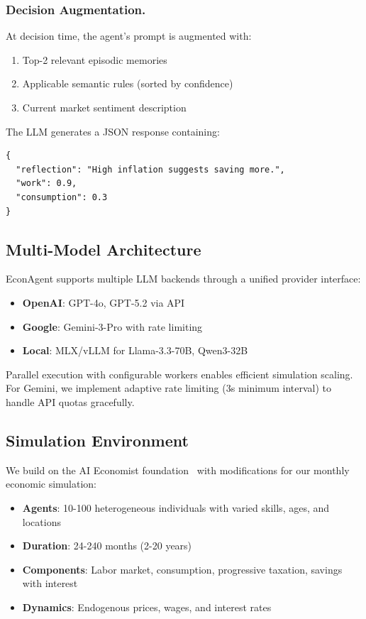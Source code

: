 \documentclass[runningheads]{llncs}
\begin{document}
\subsubsection{Decision Augmentation.}
At decision time, the agent's prompt is augmented with:
\begin{enumerate}
    \item Top-2 relevant episodic memories
    \item Applicable semantic rules (sorted by confidence)
    \item Current market sentiment description
\end{enumerate}

The LLM generates a JSON response containing:
\begin{verbatim}
{
  "reflection": "High inflation suggests saving more.",
  "work": 0.9,
  "consumption": 0.3
}
\end{verbatim}

\subsection{Multi-Model Architecture}

EconAgent supports multiple LLM backends through a unified provider interface:

\begin{itemize}
    \item \textbf{OpenAI}: GPT-4o, GPT-5.2 via API
    \item \textbf{Google}: Gemini-3-Pro with rate limiting
    \item \textbf{Local}: MLX/vLLM for Llama-3.3-70B, Qwen3-32B
\end{itemize}

Parallel execution with configurable workers enables efficient simulation scaling. For Gemini, we implement adaptive rate limiting (3s minimum interval) to handle API quotas gracefully.

\subsection{Simulation Environment}

We build on the AI Economist foundation~\cite{zheng2020ai} with modifications for our monthly economic simulation:
\begin{itemize}
    \item \textbf{Agents}: 10-100 heterogeneous individuals with varied skills, ages, and locations
    \item \textbf{Duration}: 24-240 months (2-20 years)
    \item \textbf{Components}: Labor market, consumption, progressive taxation, savings with interest
    \item \textbf{Dynamics}: Endogenous prices, wages, and interest rates
\end{itemize}
\end{document}
